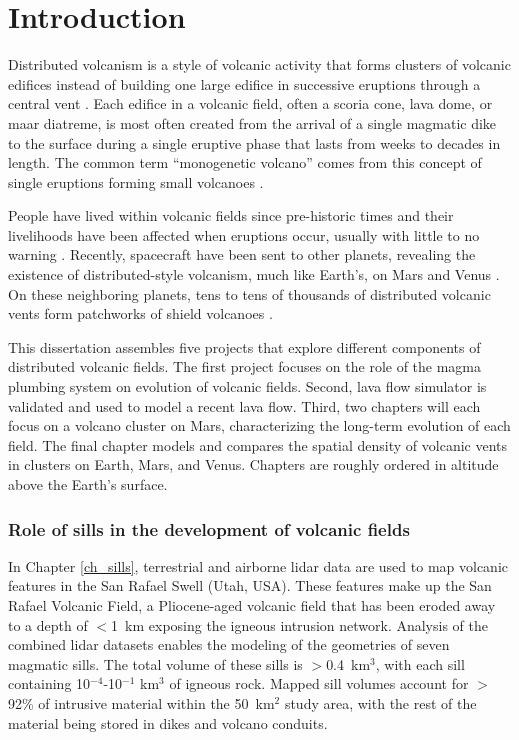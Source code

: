 \chapter[Introduction]{Introduction}

Distributed volcanism is a style of volcanic activity that forms clusters of volcanic edifices instead of building one large edifice in successive eruptions through a central vent \citep{valentine2000basaltic}. Each edifice in a volcanic field, often a scoria cone, lava dome, or maar diatreme, is most often created from the arrival of a single magmatic dike to the surface during a single eruptive phase that lasts from weeks to decades in length. The common term ``monogenetic volcano'' comes from this concept of single eruptions forming small volcanoes \citep{greeley1977basaltic}.

People have lived within volcanic fields since pre-historic times and their livelihoods have been affected when eruptions occur, usually with little to no warning \citep{elson2007living}. Recently, spacecraft have been sent to other planets, revealing the existence of distributed-style volcanism, much like Earth's, on Mars \citep{Carr1977} and Venus \citep{head1992venus}. On these neighboring planets, tens to tens of thousands of distributed volcanic vents form patchworks of shield volcanoes \citep{Richardson2013,miller2012shield}. 

This dissertation assembles five projects that explore different components of distributed volcanic fields. The first project focuses on the role of the magma plumbing system on evolution of volcanic fields. Second, lava flow simulator is validated and used to model a recent lava flow. Third, two chapters will each focus on a volcano cluster on Mars, characterizing the long-term evolution of each field. The final chapter models and compares the spatial density of volcanic vents in clusters on Earth, Mars, and Venus. Chapters are roughly ordered in altitude above the Earth's surface. 

\subsection{Role of sills in the development of volcanic fields}
In Chapter \ref{ch_sills}, terrestrial and airborne lidar data are used to map volcanic features in the San Rafael Swell (Utah, USA). These features make up the San Rafael Volcanic Field, a Pliocene-aged volcanic field that has been eroded away to a depth of $<$1~km exposing the igneous intrusion network. Analysis of the combined lidar datasets enables the modeling of the geometries of seven magmatic sills. The total volume of these sills is $>$0.4~km$^3$, with each sill containing 10$^{-4}$-10$^{-1}$ km$^3$ of igneous rock. Mapped sill volumes account for $>$92\% of intrusive material within the 50~km$^2$ study area, with the rest of the material being stored in dikes and volcano conduits.

